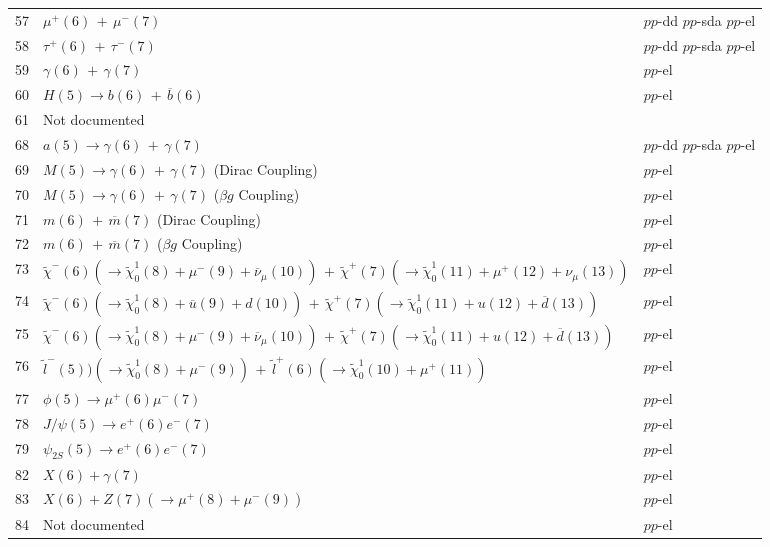 \documentclass{article}
\begin{document}
\begin{center}
\begin{tabular}{|c|l|l|}
57 & $\mu^+(6)\,+\,\mu^-(7)$ &  $pp$-dd  $pp$-sda  $pp$-el  \\

58 & $\tau^+(6)\,+\,\tau^-(7)$ &  $pp$-dd  $pp$-sda  $pp$-el  \\

59 & $\gamma(6)\,+\,\gamma(7)$ &  $pp$-el  \\

60 & $H(5) \to b(6)\,+\,\overline{b}(6)$ &  $pp$-el  \\

61 & Not documented &  \\

68 & $a(5)\to \gamma(6)\,+\,\gamma(7)$ &  $pp$-dd  $pp$-sda  $pp$-el  \\

69 & $M(5) \to \gamma(6)\,+\,\gamma(7)$ (Dirac Coupling) &  $pp$-el  \\

70 & $M(5) \to \gamma(6)\,+\,\gamma(7)$ ($\beta g$ Coupling) &  $pp$-el  \\

71 & $m(6)\,+\,\overline{m}(7)$ (Dirac Coupling) &  $pp$-el  \\

72 & $m(6)\,+\,\overline{m}(7)$ ($\beta g$ Coupling) &  $pp$-el  \\

73 & $\tilde{\chi}^-(6)(\to \tilde{\chi}_0^1 (8)+\mu^-(9)+\overline{\nu}_\mu (10)) \,+\,\tilde{\chi}^+(7)(\to \tilde{\chi}_0^1 (11)+\mu^+(12)+\nu_\mu (13))$ &  $pp$-el  \\

74 & $\tilde{\chi}^-(6)(\to \tilde{\chi}_0^1 (8)+\overline{u}(9)+d(10)) \,+\,\tilde{\chi}^+(7)(\to \tilde{\chi}_0^1 (11)+u(12)+\overline{d} (13))$ &  $pp$-el  \\

75 & $\tilde{\chi}^-(6)(\to \tilde{\chi}_0^1 (8)+\mu^-(9)+\overline{\nu}_\mu (10)) \,+\,\tilde{\chi}^+(7)(\to \tilde{\chi}_0^1 (11)+u(12)+\overline{d} (13))$ &  $pp$-el  \\

76 & $\tilde{l}^-(5))(\to \tilde{\chi}_0^1 (8)+\mu^-(9)) \,+\,\tilde{l}^+(6) (\to \tilde{\chi}_0^1 (10)+\mu^+(11))$ &  $pp$-el  \\

77 & $\phi(5)\to \mu^+(6)\mu^-(7)$ &  $pp$-el  \\

78 & $J/\psi(5)\to e^+(6)e^-(7)$ &  $pp$-el  \\

79 & $\psi_{2S}(5)\to e^+(6)e^-(7)$ &  $pp$-el  \\

82 & $X(6) + \gamma(7)$ &  $pp$-el  \\

83 & $X(6) + Z(7)(\to \mu^+ (8)+\mu^- (9))$ &  $pp$-el  \\

84 & Not documented &  $pp$-el  \\

\hline
\end{tabular}
\end{center}
 
\end{document}

